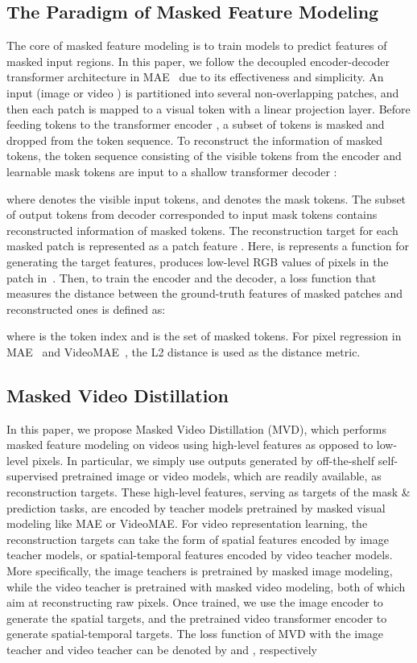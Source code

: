 \documentclass[10pt,twocolumn,letterpaper]{article}
\begin{document}
\subsection{The Paradigm of Masked Feature Modeling}
\label{sec:mfm}
The core of masked feature modeling is to train models to predict features of masked input regions. In this paper, we follow the decoupled encoder-decoder transformer architecture in MAE~\cite{he2021masked} due to its effectiveness and simplicity. An input  (image  or video ) is partitioned into several non-overlapping patches, and then each patch is mapped to a visual token with a linear projection layer. Before feeding tokens to the transformer encoder , a subset of tokens is masked and dropped from the token sequence. To reconstruct the information of masked tokens, the token sequence consisting of the visible tokens from the encoder and learnable mask tokens are input to a shallow transformer decoder :



where  denotes the visible input tokens, and  denotes the mask tokens. The subset of output tokens from decoder corresponded to input mask tokens contains reconstructed information of masked tokens. The reconstruction target for each masked patch  is represented as a patch feature .
Here,  is represents a function for generating the target features, \eg  produces low-level RGB values of pixels in the patch in~\cite{tong2022videomae,feichtenhofer2022masked}. Then, to train the encoder and the decoder, a loss function that measures the distance  between the ground-truth features of masked patches and reconstructed ones is defined as:



where  is the token index and  is the set of masked tokens. For pixel regression in MAE~\cite{he2021masked} and VideoMAE~\cite{tong2022videomae}, the L2 distance is used as the distance metric.

\subsection{Masked Video Distillation}
\label{sec:mvd}
In this paper, we propose Masked Video Distillation (MVD), which performs masked feature modeling on videos using high-level features as opposed to low-level pixels. In particular, we simply use outputs generated by off-the-shelf self-supervised pretrained image or video models, which are readily available, as reconstruction targets. These high-level features, serving as targets of the mask \& prediction tasks, are encoded by teacher models pretrained by masked visual modeling like MAE or VideoMAE. For video representation learning, the reconstruction targets can take the form of spatial features encoded by image teacher models, or spatial-temporal features encoded by video teacher models. 
More specifically, the image teachers is pretrained by masked image modeling, while the video teacher is pretrained with masked video modeling, both of which aim at reconstructing raw pixels. Once trained, we use the image encoder  to generate the spatial targets, and the pretrained video transformer encoder  to generate spatial-temporal targets. The loss function of MVD with the image teacher and video teacher can be denoted by  and  , respectively
\end{document}
